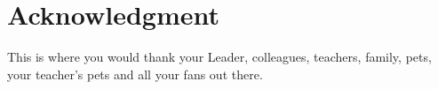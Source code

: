 \chapter*{Acknowledgment}

This is where you would thank your Leader, colleagues, teachers,
family, pets, your teacher's pets and all your fans out there.

